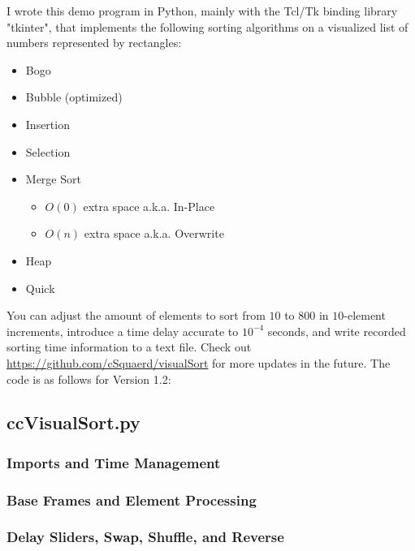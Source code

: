 \documentclass[12pt]{article}
\begin{document}
	I wrote this demo program in Python, mainly with the Tcl/Tk binding library "tkinter", that implements the following sorting algorithms on a visualized list of numbers represented by rectangles:
	\begin{itemize}
		\item Bogo
		\item Bubble (optimized)
		\item Insertion
		\item Selection
		\item Merge Sort
		\begin{itemize}
			\item $O(0)$ extra space a.k.a. In-Place
			\item $O(n)$ extra space a.k.a. Overwrite
		\end{itemize}
		\item Heap
		\item Quick
	\end{itemize}

	You can adjust the amount of elements to sort from $10$ to $800$ in $10$-element increments, introduce a time delay accurate to $10^{-4}$ seconds, and write recorded sorting time information to a text file. Check out \url{https://github.com/cSquaerd/visualSort} for more updates in the future. The code is as follows for Version 1.2:

	\subsection{ccVisualSort.py}
	\scriptsize

	\subsubsection{Imports and Time Management}
	
	\pagebreak

	\subsubsection{Base Frames and Element Processing}
	
	\pagebreak

	\subsubsection{Delay Sliders, Swap, Shuffle, and Reverse}
	
	\pagebreak
\end{document}
